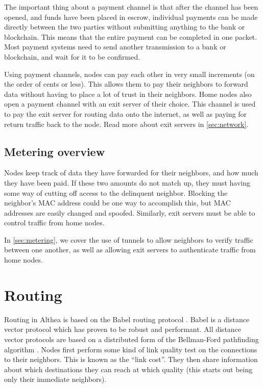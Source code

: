 \documentclass[11pt]{article}
\begin{document}
The important thing about a payment channel is that after the channel has been opened, and funds have been placed in escrow, individual payments can be made directly between the two parties without submitting anything to the bank or blockchain. This means that the entire payment can be completed in one packet. Most payment systems need to send another transmission to a bank or blockchain, and wait for it to be confirmed. 
 
Using payment channels, nodes can pay each other in very small increments (on the order of cents or less). This allows them to pay their neighbors to forward data without having to place a lot of trust in their neighbors. Home nodes also open a payment channel with an exit server of their choice. This channel is used to pay the exit server for routing data onto the internet, as well as paying for return traffic back to the node. Read more about exit servers in \autoref{sec:network}.

\subsection{Metering overview}
Nodes keep track of data they have forwarded for their neighbors, and how much they have been paid. If these two amounts do not match up, they must having some way of cutting off access to the delinquent neighbor. Blocking the neighbor’s MAC address could be one way to accomplish this, but MAC addresses are easily changed and spoofed. Similarly, exit servers must be able to control traffic from home nodes.
 
In \autoref{sec:metering}, we cover the use of tunnels to allow neighbors to verify traffic between one another, as well as allowing exit servers to authenticate traffic from home nodes.

\section{Routing}
\label{sec:routing}
Routing in Althea is based on the Babel routing protocol \cite{babel}. Babel is a distance vector protocol which has proven to be robust and performant. All distance vector protocols are based on a distributed form of the Bellman-Ford pathfinding algorithm \cite{bellmanford}. Nodes first perform some kind of link quality test on the connections to their neighbors. This is known as the ``link cost''. They then share information about which destinations they can reach at which quality (this starts out being only their immediate neighbors).
 
\end{document}
